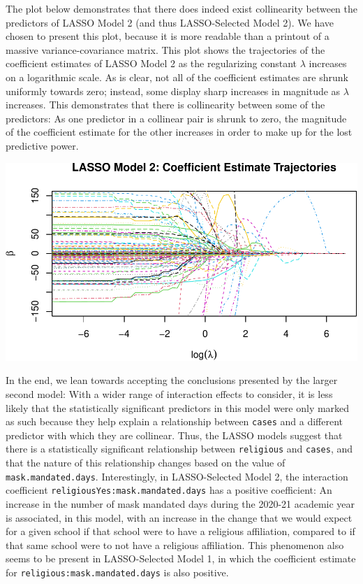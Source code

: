 \documentclass[
]{article}
\begin{document}
The plot below demonstrates that there does indeed exist collinearity
between the predictors of LASSO Model 2 (and thus LASSO-Selected Model
2). We have chosen to present this plot, because it is more readable
than a printout of a massive variance-covariance matrix. This plot shows
the trajectories of the coefficient estimates of LASSO Model 2 as the
regularizing constant \(\lambda\) increases on a logarithmic scale. As
is clear, not all of the coefficient estimates are shrunk uniformly
towards zero; instead, some display sharp increases in magnitude as
\(\lambda\) increases. This demonstrates that there is collinearity
between some of the predictors: As one predictor in a collinear pair is
shrunk to zero, the magnitude of the coefficient estimate for the other
increases in order to make up for the lost predictive power.

\includegraphics{final_files/figure-latex/unnamed-chunk-34-1.pdf}

In the end, we lean towards accepting the conclusions presented by the
larger second model: With a wider range of interaction effects to
consider, it is less likely that the statistically significant
predictors in this model were only marked as such because they help
explain a relationship between \texttt{cases} and a different predictor
with which they are collinear. Thus, the LASSO models suggest that there
is a statistically significant relationship between \texttt{religious}
and \texttt{cases}, and that the nature of this relationship changes
based on the value of \texttt{mask.mandated.days}. Interestingly, in
LASSO-Selected Model 2, the interaction coefficient
\texttt{religiousYes:mask.mandated.days} has a positive coefficient: An
increase in the number of mask mandated days during the 2020-21 academic
year is associated, in this model, with an increase in the change that
we would expect for a given school if that school were to have a
religious affiliation, compared to if that same school were to not have
a religious affiliation. This phenomenon also seems to be present in
LASSO-Selected Model 1, in which the coefficient estimate for
\texttt{religious:mask.mandated.days} is also positive.
\end{document}
